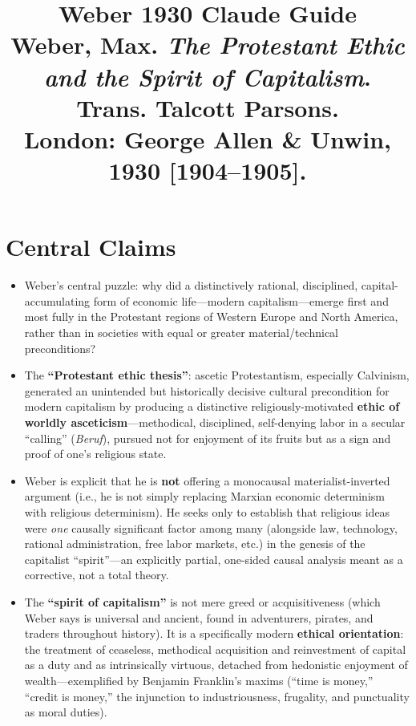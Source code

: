 \documentclass[12pt]{article}
\title{\textbf{Weber 1930 Claude Guide}\\
\large Weber, Max. \textit{The Protestant Ethic and the Spirit of Capitalism}. Trans. Talcott Parsons.\\
London: George Allen \& Unwin, 1930 [1904--1905].}
\author{}
\date{}
\begin{document}
\maketitle
\tableofcontents
\newpage

\section{Central Claims}

\begin{itemize}[leftmargin=*, itemsep=4pt]
    \item Weber's central puzzle: why did a distinctively rational, disciplined, capital-accumulating form of economic life---modern capitalism---emerge first and most fully in the Protestant regions of Western Europe and North America, rather than in societies with equal or greater material/technical preconditions?
    \item The \textbf{``Protestant ethic thesis''}: ascetic Protestantism, especially Calvinism, generated an unintended but historically decisive cultural precondition for modern capitalism by producing a distinctive religiously-motivated \textbf{ethic of worldly asceticism}---methodical, disciplined, self-denying labor in a secular ``calling'' (\textit{Beruf}), pursued not for enjoyment of its fruits but as a sign and proof of one's religious state.
    \item Weber is explicit that he is \textbf{not} offering a monocausal materialist-inverted argument (i.e., he is not simply replacing Marxian economic determinism with religious determinism). He seeks only to establish that religious ideas were \emph{one} causally significant factor among many (alongside law, technology, rational administration, free labor markets, etc.) in the genesis of the capitalist ``spirit''---an explicitly partial, one-sided causal analysis meant as a corrective, not a total theory.
    \item The \textbf{``spirit of capitalism''} is not mere greed or acquisitiveness (which Weber says is universal and ancient, found in adventurers, pirates, and traders throughout history). It is a specifically modern \textbf{ethical orientation}: the treatment of ceaseless, methodical acquisition and reinvestment of capital as a duty and as intrinsically virtuous, detached from hedonistic enjoyment of wealth---exemplified by Benjamin Franklin's maxims (``time is money,'' ``credit is money,'' the injunction to industriousness, frugality, and punctuality as moral duties).

\end{itemize}
\end{document}
